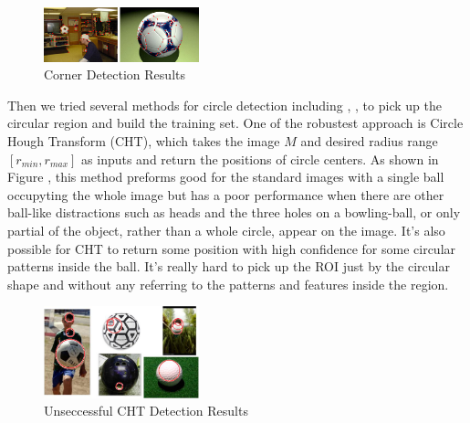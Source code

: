 \documentclass{article}
\begin{document}
\begin{figure}[htp]
\centering
\includegraphics[width=0.4\textwidth]{CornerDetection.jpg}
\caption{Corner Detection Results}
\label{fig:crd}
\end{figure}

Then we tried several methods for circle detection including \cite{cirDetect1}, \cite{cirDetect2}, \cite{cirDetect3} to pick up the circular region and build the training set. One of the robustest approach is Circle Hough Transform (CHT), which takes the image $M$ and desired radius range $[r_{min},r_{max}]$ as inputs and return the positions of circle centers. As shown in Figure \cite{cird}, this method preforms good for the standard images with a single ball occupyting the whole image but has a poor performance when there are other ball-like distractions such as heads and the three holes on a bowling-ball, or only partial of the object, rather than a whole circle, appear on the image. It's also possible for CHT to return some position with high confidence for some circular patterns inside the ball. It's really hard to pick up the ROI just by the circular shape and without any referring to the patterns and features inside the region. \\

\begin{figure}[htp]
\centering
\includegraphics[width=0.4\textwidth]{circleDetection.jpg}
\caption{Unseccessful CHT Detection Results}
\label{fig:cird}
\end{figure}
\end{document}
